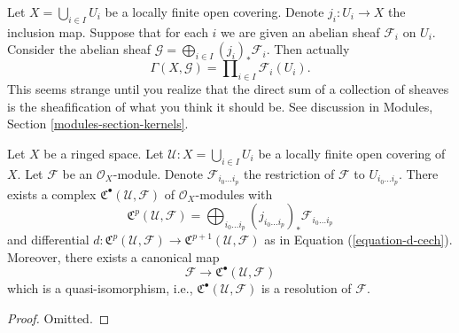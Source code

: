 \begin{remark}
\label{remark-locally-finite-sections}
Let $X = \bigcup_{i \in I} U_i$ be a locally finite open covering.
Denote $j_i : U_i \to X$ the inclusion map. Suppose that for each $i$
we are given an abelian sheaf $\mathcal{F}_i$ on $U_i$. Consider the
abelian sheaf $\mathcal{G} = \bigoplus_{i \in I} (j_i)_*\mathcal{F}_i$.
Then actually
$$
\Gamma(X, \mathcal{G}) = \prod\nolimits_{i \in I} \mathcal{F}_i(U_i).
$$
This seems strange until you realize that the direct sum of a collection
of sheaves is the sheafification of what you think it should be.
See discussion in Modules, Section \ref{modules-section-kernels}.
\end{remark}

\begin{lemma}
\label{lemma-locally-finite-covering-resolution}
Let $X$ be a ringed space.
Let $\mathcal{U} : X = \bigcup_{i \in I} U_i$ be a locally finite open
covering of $X$.
Let $\mathcal{F}$ be an $\mathcal{O}_X$-module.
Denote $\mathcal{F}_{i_0 \ldots i_p}$ the restriction of
$\mathcal{F}$ to $U_{i_0 \ldots i_p}$. There exists a complex
${\mathfrak C}^\bullet(\mathcal{U}, \mathcal{F})$
of $\mathcal{O}_X$-modules with
$$
{\mathfrak C}^p(\mathcal{U}, \mathcal{F}) =
\bigoplus\nolimits_{i_0 \ldots i_p}
(j_{i_0 \ldots i_p})_* \mathcal{F}_{i_0 \ldots i_p}
$$
and differential
$d : {\mathfrak C}^p(\mathcal{U}, \mathcal{F})
\to {\mathfrak C}^{p + 1}(\mathcal{U}, \mathcal{F})$
as in Equation (\ref{equation-d-cech}). Moreover, there exists a canonical
map
$$
\mathcal{F} \to {\mathfrak C}^\bullet(\mathcal{U}, \mathcal{F})
$$
which is a quasi-isomorphism, i.e.,
${\mathfrak C}^\bullet(\mathcal{U}, \mathcal{F})$
is a resolution of $\mathcal{F}$.
\end{lemma}

\begin{proof}
Omitted.
\end{proof}

